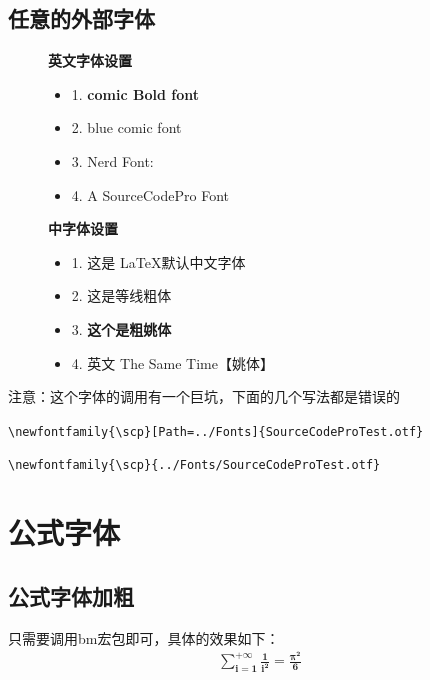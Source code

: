 \documentclass[fontset=windows, 12pt]{article}
\newcommand{\Yaoti}{\yaoti \CJKfamily{yaoti}}
\begin{document}
\subsection{任意的外部字体}
\begin{figure}[!htb]
    \begin{minipage}[t]{0.45\linewidth}
        \centerline{\bf 英文字体设置}
        \begin{itemize}
            \item 1. {\bf \comic comic Bold font}
            \item 2. {\comicblue blue comic font}  
            \item 3. {\Meslo Nerd Font:    }
            \item 4. {\scp A SourceCodePro Font}
        \end{itemize}
    \end{minipage}
    \hfill
    \vline
    \begin{minipage}[t]{0.45\linewidth}
        \centerline{\bf 中字体设置}
        \begin{itemize}
            \item 1.  这是 \LaTeX 默认中文字体
            \item 2. { 这是等线粗体}
            \item 3. { \bfseries 这个是粗姚体}
            \item 4. {\Yaoti 英文 The Same Time【姚体】}
        \end{itemize}         
    \end{minipage}
\end{figure} 

\begin{tcolorbox}[colback=red!5!white,colframe=red!75!black,title= 路径设置]
注意：这个字体的调用有一个巨坑，下面的几个写法都是错误的

\verb|\newfontfamily{\scp}[Path=../Fonts]{SourceCodeProTest.otf}|

\verb|\newfontfamily{\scp}{../Fonts/SourceCodeProTest.otf}|
\end{tcolorbox}

\section{公式字体}

\subsection{公式字体加粗}
只需要调用bm宏包即可，具体的效果如下：
\begin{align}
    \boxed{
    \bm {    
        \sum_{i=1}^{+\infty}{\frac{1}{i^2}} = \frac{\pi^2}{6}
    }}
\end{align}
\end{document}
